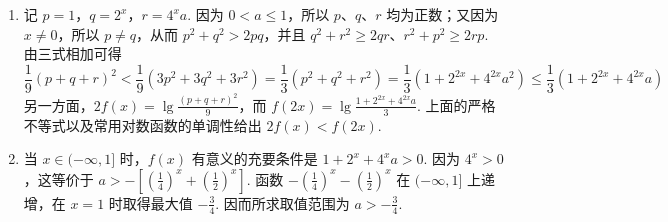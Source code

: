 \documentclass[UTF8,a4paper,oneside,11pt]{ctexbook}
\begin{document}
\begin{solution}
\begin{enumerate}
\item 记 \(p=1\)，\(q=2^x\)，\(r=4^xa\). 因为 \(0<a\leqslant1\)，所以 \(p\)、\(q\)、\(r\) 均为正数；又因为 \(x\neq0\)，所以 \(p\neq q\)，从而 \(p^2+q^2>2pq\)，并且 \(q^2+r^2\geqslant2qr\)、\(r^2+p^2\geqslant2rp\). 由三式相加可得
\[
\frac{1}{9}(p+q+r)^2
<\frac{1}{9}\left(3p^2+3q^2+3r^2\right)
=\frac{1}{3}(p^2+q^2+r^2)
=\frac{1}{3}\left(1+2^{2x}+4^{2x}a^2\right)
\leqslant\frac{1}{3}\left(1+2^{2x}+4^{2x}a\right)
\]
另一方面，\(2f(x)=\lg\frac{(p+q+r)^2}{9}\)，而 \(f(2x)=\lg\frac{1+2^{2x}+4^{2x}a}{3}\). 上面的严格不等式以及常用对数函数的单调性给出 \(2f(x)<f(2x)\).

\item 当 \(x\in(-\infty,1]\) 时，\(f(x)\) 有意义的充要条件是 \(1+2^x+4^xa>0\). 因为 \(4^x>0\)，这等价于 \(\displaystyle a>-\left[\left(\frac{1}{4}\right)^x+\left(\frac{1}{2}\right)^x\right]\). 函数 \(-\left(\frac{1}{4}\right)^x-\left(\frac{1}{2}\right)^x\) 在 \((-\infty,1]\) 上递增，在 \(x=1\) 时取得最大值 \(-\frac{3}{4}\). 因而所求取值范围为 \(\displaystyle a>-\frac{3}{4}\).
\end{enumerate}
\end{solution}

\end{document}

